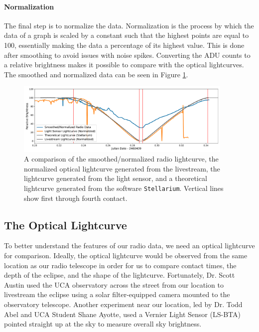 \paragraph{Normalization}
The final step is to normalize the data.
Normalization is the process by which the data of a graph is scaled by a constant such that the highest points are equal to 100, essentially making the data a percentage of its highest value.
This is done after smoothing to avoid issues with noise spikes.
Converting the ADU counts to a relative brightness makes it possible to compare with the optical lightcurves.
The smoothed and normalized data can be seen in Figure \ref{fig:LightcurveComparison}.


\begin{figure}[h]
    \includegraphics[width=0.93\textwidth]{figures/LightcurveComparison.pdf}
    \caption{\label{fig:LightcurveComparison} A comparison of the smoothed/normalized radio lightcurve, the normalized optical lightcurve generated from the livestream, the lightcurve generated from the light sensor, and a theoretical lightcurve generated from the software \texttt{Stellarium}. Vertical lines show first through fourth contact.}
\end{figure}



\subsection{\label{sec:optical}The Optical Lightcurve}

To better understand the features of our radio data, we need an optical lightcurve for comparison.
Ideally, the optical lightcurve would be observed from the same location as our radio telescope in order for us to compare contact times, the depth of the eclipse, and the shape of the lightcurve.
Fortunately, Dr. Scott Austin used the UCA observatory across the street from our location to livestream the eclipse using a solar filter-equipped camera mounted to the observatory telescope.
Another experiment near our location, led by Dr. Todd Abel and UCA Student Shane Ayotte, used a Vernier Light Sensor (LS-BTA) pointed straight up at the sky to measure overall sky brightness.
